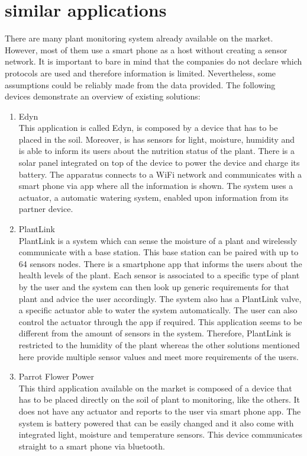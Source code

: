 \section{similar applications}
There are many plant monitoring system already available on the market. However, most of them use a smart phone as a host without creating a sensor network. It is important to bare in mind that the companies do not declare which protocols are used and therefore information is limited. Nevertheless, some assumptions could be reliably made from the data provided. The following devices demonstrate an overview of existing solutions:\\
\begin{enumerate}
	\item Edyn \cite{Edyn} \\
This application is called Edyn, is composed by a device that has to be placed in the soil. Moreover, is has sensors for light, moisture, humidity and is able to inform its users about the nutrition status of the plant. There is a solar panel integrated on top of the device to power the device and charge its battery. The apparatus connects to a WiFi network and communicates with a smart phone via app where all the information is shown. The system uses a actuator, a automatic watering system, enabled upon information from its partner device.\\
\item PlantLink \cite{MyPlantlink}\\
PlantLink is a system which can sense the moisture of a plant and wirelessly communicate with a base station. This base station can be paired with up to 64 sensors nodes. There is a smartphone app that informs the users about the health levels of the plant. Each sensor is associated to a specific type of plant by the user and the system can then look up generic requirements for that plant and advice the user accordingly. The system also has a PlantLink valve, a specific actuator able to water the system automatically. The user can also control the actuator through the app if required. This application seems to be different from the amount of sensors in the system. Therefore, PlantLink is restricted to the humidity of the plant whereas the other solutions mentioned here provide multiple sensor values and meet more requirements of the users.\\

\item Parrot Flower Power \cite{parrot}\\
This third application available on the market is composed of a device that has to be placed directly on the soil of plant to monitoring, like the others. It does not have any actuator and reports to the user via smart phone app. The system is battery powered that can be easily changed and it also come with integrated light, moisture and temperature sensors. This device communicates straight to a smart phone via bluetooth.
\end{enumerate}


